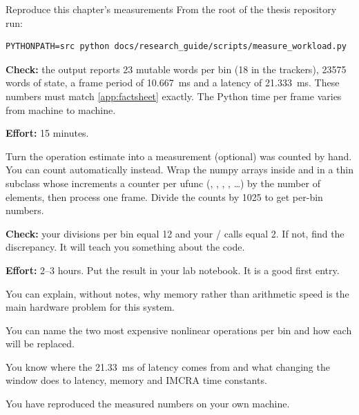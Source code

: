 \begin{stepbox}[label=st:workload:reproduce]{Reproduce this chapter's measurements}
From the root of the thesis repository run:
\begin{lstlisting}[style=shell]
PYTHONPATH=src python docs/research_guide/scripts/measure_workload.py
\end{lstlisting}
\textbf{Check:} the output reports 23 mutable words per bin (18 in the trackers),
\num{23575} words of state, a frame period of \qty{10.667}{\ms} and a latency of
\qty{21.333}{\ms}. These numbers must match \cref{app:factsheet} exactly. The
Python time per frame varies from machine to machine.

\textbf{Effort:} 15 minutes.
\end{stepbox}

\begin{stepbox}[label=st:workload:opcount]{Turn the operation estimate into a measurement (optional)}
 was counted by hand. You can count automatically
instead. Wrap the numpy arrays inside  and
 in a thin  subclass
whose  increments a counter per ufunc
(, , , , \ldots) by the
number of elements, then process one frame. Divide the counts by 1025 to get
per-bin numbers.

\textbf{Check:} your divisions per bin equal 12 and your /
calls equal 2. If not, find the discrepancy. It will teach you something about
the code.

\textbf{Effort:} 2--3 hours. Put the result in your lab notebook. It is a good
first entry.
\end{stepbox}

\begin{donebox}
\begin{checklist}
  \item You can explain, without notes, why memory rather than arithmetic speed
        is the main hardware problem for this system.
  \item You can name the two most expensive nonlinear operations per bin and how
        each will be replaced.
  \item You know where the \qty{21.33}{\ms} of latency comes from and what
        changing the window does to latency, memory and IMCRA time constants.
  \item You have reproduced the measured numbers on your own machine.
\end{checklist}
\end{donebox}
